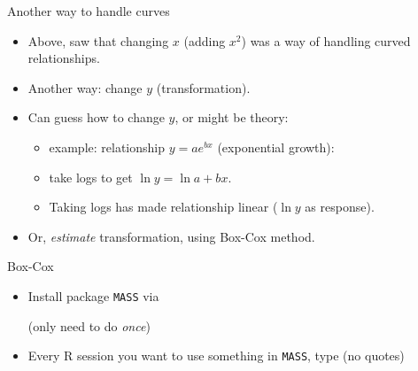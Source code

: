 \begin{frame}[fragile]{Another way to handle curves}
  
  \begin{itemize}
  \item Above, saw that changing $x$ (adding $x^2$) was a way of
    handling curved relationships.
  \item Another way: change $y$ (transformation).
  \item Can guess how to change $y$, or might be theory:
    \begin{itemize}
    \item example: relationship $y=ae^{bx}$ (exponential growth): 

    \item take
      logs to get $\ln y=\ln a + bx$.
    \item Taking logs has made relationship linear ($\ln y$ as response).
    \end{itemize}
  \item Or, \emph{estimate} transformation, using Box-Cox method. 
  \end{itemize}
  
\end{frame}

\begin{frame}[fragile]{Box-Cox}
  
  \begin{itemize}
  \item Install package \texttt{MASS} via
 
\begin{knitrout}
\color{fgcolor}\begin{kframe}
\begin{alltt}
\hlstd{(}\hlstd{)}
\end{alltt}
\end{kframe}
\end{knitrout}
(only need to do \emph{once})
\item Every R session you want to use something in \texttt{MASS}, type
  (no quotes)
 
\begin{knitrout}
\color{fgcolor}\begin{kframe}
\begin{alltt}
\end{alltt}


{\ttfamily\noindent\itshape\color{messagecolor}{\\Attaching package: 'MASS'}}

{\ttfamily\noindent\itshape\color{messagecolor}{The following object is masked from 'package:dplyr':

\ \ \ \ select}}\end{kframe}
\end{knitrout}

\end{itemize}
  
\end{frame}

